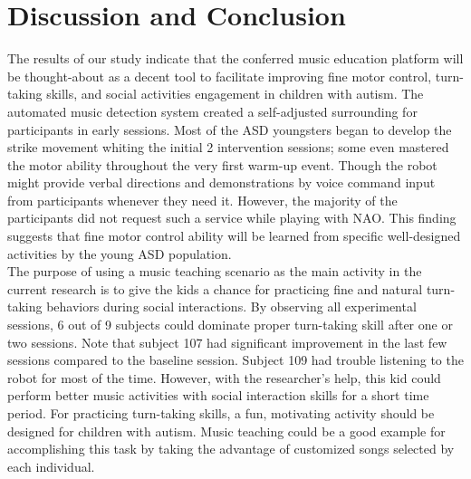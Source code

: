 \section{Discussion and Conclusion}
The results of our study indicate that the conferred music education platform will be thought-about as a decent tool to facilitate 
improving fine motor control, turn-taking skills, and social activities engagement in children with autism. The automated music 
detection system created a self-adjusted surrounding for participants in early sessions. Most
of the ASD youngsters began to develop the strike movement whiting the initial 2 intervention sessions; some 
even mastered the motor ability throughout the very first warm-up event. Though the robot might
provide verbal directions and demonstrations by voice command input from participants whenever they need it. However, 
the majority of the participants did not request such a service while playing with NAO. This finding
suggests that fine motor control ability will be learned from specific well-designed activities by
the young ASD population. \\

The purpose of using a music teaching scenario as the main activity in the current research is to 
give the kids a chance for practicing fine and natural turn-taking behaviors during social interactions. By observing all 
experimental sessions, 6 out of 9 subjects could dominate proper turn-taking skill after one or two
sessions. Note that subject 107 had significant improvement in the last few sessions compared to the
baseline session. Subject 109 had trouble listening to the robot for most of the time.
However, with the researcher's help, this kid could perform better music activities with social interaction skills
for a short time period. For practicing turn-taking skills, a fun, motivating activity should be 
designed for children with autism. Music teaching could be a good example for accomplishing this
task by taking the advantage of customized songs selected by each individual.\\

